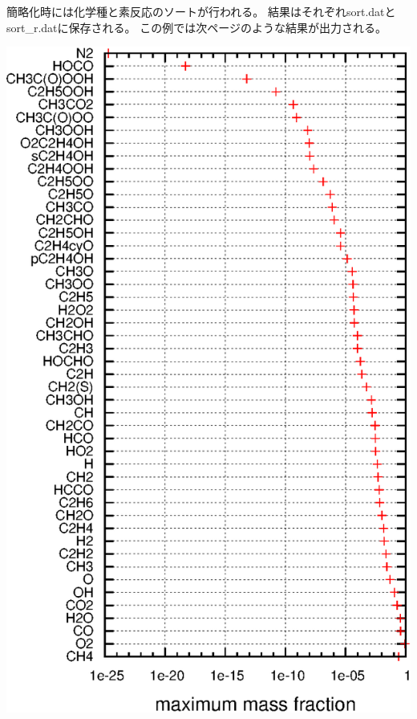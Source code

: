 \documentclass{jsarticle}
\begin{document}
簡略化時には化学種と素反応のソートが行われる。
結果はそれぞれsort.datとsort\_r.datに保存される。
この例では次ページのような結果が出力される。
\begin{center}
\includegraphics[height=\textheight]{sample/no24.2.eps}

\end{center}
\end{document}
